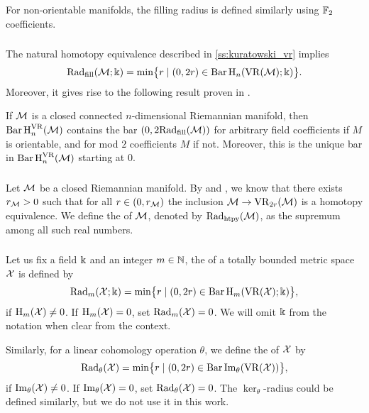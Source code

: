 For non-orientable manifolds, the filling radius is defined similarly using \(\Ftwo\) coefficients.

\subsubsection{}

The natural homotopy equivalence described in \cref{ss:kuratowski_vr} implies
\[
\fillrad(\cM; \field) = \min\set[\big]{r \mid (0, 2r) \in \barc \rH_n(\VR(\cM); \field)}.
\]
Moreover, it gives rise to the following result proven in \cite[Prop.~9.28]{lim2024vietoris}.

\medskip\lemma
If $\cM$ is a closed connected $n$-dimensional Riemannian manifold, then \(\Hbarc{n}{\cM}\) contains the bar \((0,2\fillrad(\cM))\) for arbitrary field coefficients if $M$ is orientable, and for mod $2$ coefficients $M$ if not.
Moreover, this is the unique bar in \(\Hbarc{n}{\cM}\) starting at $0$.

\subsubsection{}\label{ss:first_critical_value}

Let \(\cM\) be a closed Riemannian manifold.
By \cite[Thm.~3.5]{hausmann1995vietoris} and \cite[Thm.~4.1]{lim2024vietoris}, we know that there exists \(r_\cM > 0\) such that for all \(r \in (0, r_\cM)\) the inclusion \(\cM \to \VR_{2r}(\cM)\) is a homotopy equivalence.
We define the  of \(\cM\), denoted by \(\crit(\cM)\), as the supremum among all such real numbers.

\subsubsection{} \label{ss:beta v.s. fillrad}

Let us fix a field \(\field\) and an integer \(m \in \N\), the  of a totally bounded metric space \(\cX\) is defined by
\[
\firstdeath{m}{\cX; \field} = \min\set[\big]{r \mid (0, 2r) \in \barc \rH_m(\VR(\cX); \field)},
\]
if \(\rH_\degp(\cX) \neq 0\).
If \(\rH_\degp(\cX) = 0\), set \(\firstdeath{m}{\cX} = 0\).
We will omit \(\field\) from the notation when clear from the context.

Similarly, for a linear cohomology operation \(\theta\), we define the  of \(\cX\) by
\[
\firstdeath{\theta}{\cX} = \min\set[\big]{r \mid (0, 2r) \in \barc \img_\theta(\VR(\cX))},
\]
if \(\img_\theta(\cX) \neq 0\).
If \(\img_\theta(\cX) = 0\), set $\firstdeath{\theta}{\cX} = 0$.
The \(\ker_\theta\)-radius could be defined similarly, but we do not use it in this work.

